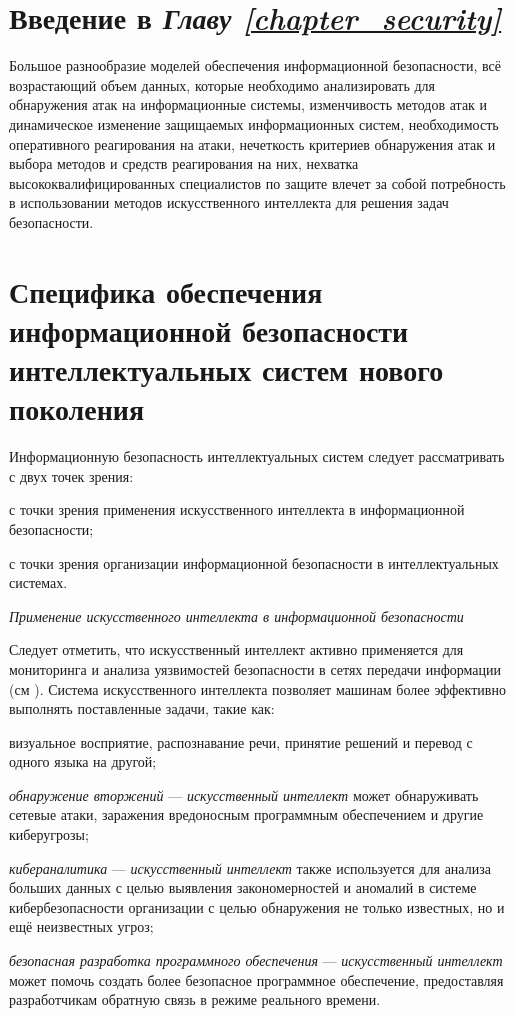 \section*{Введение в \textit{Главу \ref{chapter_security}}}
Большое разнообразие моделей обеспечения информационной безопасности, всё возрастающий объем данных, которые необходимо анализировать для обнаружения атак на информационные системы, изменчивость методов атак и динамическое изменение защищаемых информационных систем, необходимость оперативного реагирования на атаки, нечеткость критериев обнаружения атак и выбора методов и средств реагирования на них, нехватка высококвалифицированных специалистов по защите влечет за собой потребность в использовании методов искусственного интеллекта для решения задач безопасности.

\section{Специфика обеспечения информационной безопасности интеллектуальных систем нового поколения}
\label{sec_security_specifics}
Информационную безопасность интеллектуальных систем следует рассматривать с двух точек зрения:
\begin{textitemize}
	\item с точки зрения применения искусственного интеллекта в информационной безопасности;
	\item с точки зрения организации информационной безопасности в интеллектуальных системах.
\end{textitemize}

\textit{Применение искусственного интеллекта в информационной безопасности}

Следует отметить, что искусственный интеллект активно применяется для мониторинга и анализа уязвимостей безопасности в сетях передачи информации (см ). Система искусственного интеллекта позволяет машинам более эффективно выполнять поставленные задачи, такие как:

\begin{textitemize}
	\item визуальное восприятие, распознавание речи, принятие решений и перевод с одного языка на другой;
	
	\item \textit{обнаружение вторжений} --- \textit{искусственный интеллект} может обнаруживать сетевые атаки, заражения вредоносным программным обеспечением и другие киберугрозы;
	
	\item \textit{кибераналитика} --- \textit{искусственный интеллект} также используется для анализа больших данных с целью выявления закономерностей и аномалий в системе кибербезопасности организации с целью обнаружения не только известных, но и ещё неизвестных угроз;
	
	\item \textit{безопасная разработка программного обеспечения} --- \textit{искусственный интеллект} может помочь создать более безопасное программное обеспечение, предоставляя разработчикам обратную связь в режиме реального времени.
\end{textitemize}

